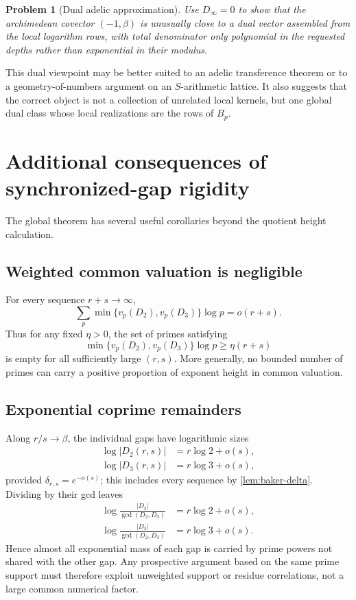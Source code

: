 \documentclass[11pt,oneside]{article}
\newtheorem{problem}[theorem]{Problem}
\theoremstyle{definition}
\begin{document}
\begin{problem}[Dual adelic approximation]
Use $D_\infty=0$ to show that the archimedean covector $(-1,\beta)$ is
unusually close to a dual vector assembled from the local logarithm rows,
with total denominator only polynomial in the requested depths rather
than exponential in their modulus.
\end{problem}

This dual viewpoint may be better suited to an adelic transference theorem
or to a geometry-of-numbers argument on an $S$-arithmetic lattice.  It
also suggests that the correct object is not a collection of unrelated
local kernels, but one global dual class whose local realizations are the
rows of $B_p$.

\section{Additional consequences of synchronized-gap rigidity}
\label{sec:consequences}

The global theorem has several useful corollaries beyond the quotient
height calculation.

\subsection{Weighted common valuation is negligible}

For every sequence $r+s\to\infty$,
\begin{equation}\label{eq:weighted-min-val}
  \sum_p\min\{v_p(D_2),v_p(D_3)\}\log p=o(r+s).
\end{equation}
Thus for any fixed $\eta>0$, the set of primes satisfying
\begin{equation}\label{eq:large-common-local}
  \min\{v_p(D_2),v_p(D_3)\}\log p\ge\eta(r+s)
\end{equation}
 is empty for all sufficiently large $(r,s)$.  More generally, no bounded
number of primes can carry a positive proportion of exponent height in
common valuation.

\subsection{Exponential coprime remainders}

Along $r/s\to\beta$, the individual gaps have logarithmic sizes
\begin{align}
  \log|D_2(r,s)|&=r\log2+o(s),\label{eq:D2-size}\\
  \log|D_3(r,s)|&=r\log3+o(s),\label{eq:D3-size}
\end{align}
provided $\delta_{r,s}=e^{-o(s)}$; this includes every sequence by
\cref{lem:baker-delta}.  Dividing by their gcd leaves
\begin{align}
  \log\frac{|D_2|}{\gcd(D_2,D_3)}&=r\log2+o(s),\\
  \log\frac{|D_3|}{\gcd(D_2,D_3)}&=r\log3+o(s).
\end{align}
Hence almost all exponential mass of each gap is carried by prime powers
not shared with the other gap.  Any prospective argument based on the
same prime support must therefore exploit unweighted support or residue
correlations, not a large common numerical factor.
\end{document}
